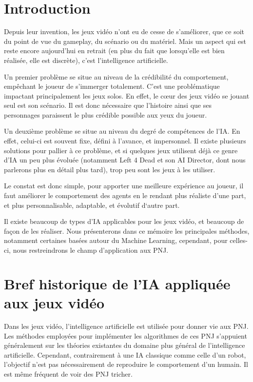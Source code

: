 \documentclass[a4paper, 12pt]{article} %
\begin{document}
\newpage
\section{Introduction}
Depuis leur invention, les jeux vidéo n’ont eu de cesse de s’améliorer, que ce soit du point de vue du gameplay, du scénario ou du matériel. Mais un aspect qui est reste encore aujourd’hui en retrait (en plus du fait que lorsqu’elle est bien réalisée, elle est discrète), c’est l’intelligence artificielle.
 
Un premier problème se situe au niveau de la crédibilité du comportement, empêchant le joueur de s'immerger totalement. C’est une problématique impactant principalement les jeux solos. En effet, le cœur des jeux vidéo se jouant seul est son scénario. Il est donc nécessaire que l’histoire ainsi que ses personnages paraissent le plus crédible possible aux yeux du joueur.

Un deuxième problème se situe au niveau du degré de compétences de l’IA. En effet, celui-ci est souvent fixe, défini à l’avance, et impersonnel. Il existe plusieurs solutions pour pallier à ce problème, et si quelques jeux utilisent déjà ce genre d’IA un peu plus évoluée (notamment Left 4 Dead et son AI Director, dont nous parlerons plus en détail plus tard), trop peu sont les jeux à les utiliser.

Le constat est donc simple, pour apporter une meilleure expérience au joueur, il faut améliorer le comportement des agents en le rendant plus réaliste d’une part, et plus personnalisable, adaptable, et évolutif d‘autre part.

Il existe beaucoup de types d’IA applicables pour les jeux vidéo, et beaucoup de façon de les réaliser. Nous présenterons dans ce mémoire les principales méthodes, notamment certaines basées autour du Machine Learning, cependant, pour celles-ci, nous restreindrons le champ d’application aux PNJ. 

\newpage
\section{Bref historique de l’IA appliquée aux jeux vidéo}
Dans les jeux vidéo, l’intelligence artificielle est utilisée pour donner vie aux PNJ. Les méthodes employées pour implémenter les algorithmes de ces PNJ s’appuient généralement sur les théories existantes du domaine plus général de l’intelligence artificielle. Cependant, contrairement à une IA classique comme celle d’un robot, l’objectif n’est pas nécessairement de reproduire le comportement d’un humain. Il est même fréquent de voir des PNJ tricher. 
\end{document}
